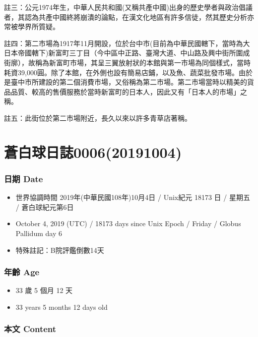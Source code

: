 \documentclass[a5paper, 12pt
]{book}
\providecommand{\tightlist}{%
  \setlength{\itemsep}{0pt}\setlength{\parskip}{0pt}}
\begin{document}
註三：公元1974年生，中華人民共和國(又稱共產中國)出身的歷史學者與政治倡議者，其認為共產中國終將崩潰的論點，在漢文化地區有許多信徒，然其歷史分析亦常被學界所質疑。

註四：第二市場為1917年11月開設，位於台中市(目前為中華民國轄下，當時為大日本帝國轄下)新富町三丁目（今中區中正路、臺灣大道、中山路及興中街所圍成街廓），故稱為新富町市場，其呈三翼放射狀的本館與第一市場為同個樣式，當時耗資39,000圓。除了本館，在外側也設有簡易店鋪，以及魚、蔬菜批發市場。由於是臺中市所建設的第二個消費市場，又俗稱為第二市場。第二市場當時以精美的貨品品質、較高的售價服務於當時新富町的日本人，因此又有「日本人的市場」之稱。

註五：此街位於第二市場附近，長久以來以許多青草店著稱。

\hypertarget{ux84bcux767dux7403ux65e5ux8a8c000620191004}{%
\section{蒼白球日誌0006(20191004)}\label{ux84bcux767dux7403ux65e5ux8a8c000620191004}}

\hypertarget{ux65e5ux671f-date-5}{%
\subsubsection{日期 Date}\label{ux65e5ux671f-date-5}}

\begin{itemize}
\tightlist
\item
  世界協調時間 2019年(中華民國108年)10月4日 / Unix紀元 18173 日 / 星期五
  / 蒼白球紀元第6日
\item
  October 4, 2019 (UTC) / 18173 days since Unix Epoch / Friday / Globus
  Pallidum day 6
\item
  特殊註記：B院評鑑倒數14天
\end{itemize}

\hypertarget{ux5e74ux9f61-age-5}{%
\subsubsection{年齡 Age}\label{ux5e74ux9f61-age-5}}

\begin{itemize}
\tightlist
\item
  33 歲 5 個月 12 天
\item
  33 years 5 months 12 days old
\end{itemize}

\hypertarget{ux672cux6587-content-5}{%
\subsubsection{本文 Content}\label{ux672cux6587-content-5}}
\end{document}
